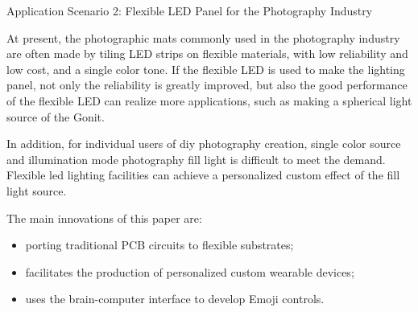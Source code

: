 \begin{eabstract}
{\heiti Application Scenario 2: Flexible LED Panel for the Photography Industry }

At present, the photographic mats commonly used in the photography industry are often made by tiling LED strips on flexible materials, with low reliability and low cost, and a single color tone. If the flexible LED is used to make the lighting panel, not only the reliability is greatly improved, but also the good performance of the flexible LED can realize more applications, such as making a spherical light source of the Gonit.

In addition, for individual users of diy photography creation, single color source and illumination mode photography fill light is difficult to meet the demand. Flexible led lighting facilities can achieve a personalized custom effect of the fill light source.


  The main innovations of this paper are:
  \begin{itemize}
    \item porting traditional PCB circuits to flexible substrates;
    \item facilitates the production of personalized custom wearable devices;
    \item uses the brain-computer interface to develop Emoji controls.
  \end{itemize}
  
\end{eabstract}

